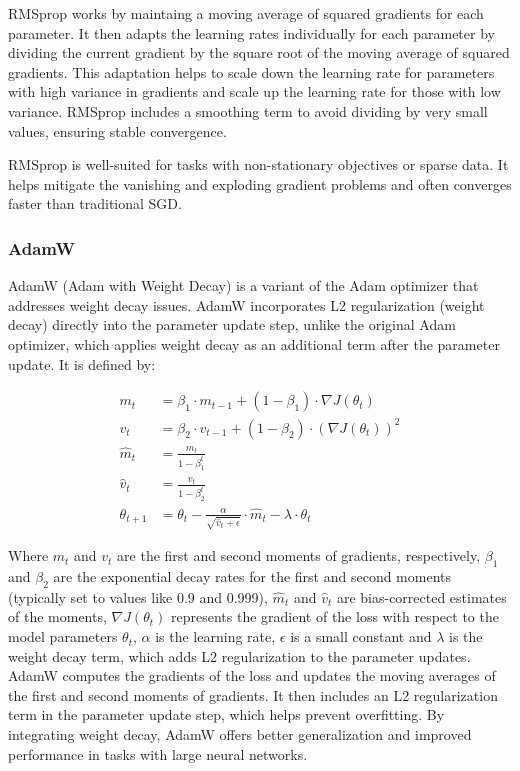 RMSprop works by maintaing a moving average of squared gradients for each parameter. It then adapts the learning rates individually for each parameter by dividing the current gradient by the square root of the moving average of squared gradients.
This adaptation helps to scale down the learning rate for parameters with high variance in gradients and scale up the learning rate for those with low variance.
RMSprop includes a smoothing term to avoid dividing by very small values, ensuring stable convergence.

RMSprop is well-suited for tasks with non-stationary objectives or sparse data. It helps mitigate the vanishing and exploding gradient problems and often converges faster than traditional SGD.

\subsubsection{AdamW}

AdamW (Adam with Weight Decay) is a variant of the Adam optimizer that addresses weight decay issues. AdamW incorporates L2 regularization (weight decay) directly into the parameter update step, unlike the original Adam optimizer, which applies weight decay as an additional term after the parameter update. It is defined by:

\begin{align}
	m_t &= \beta_1 \cdot m_{t-1} + (1 - \beta_1) \cdot \nabla J(\theta_t) \\
	v_t &= \beta_2 \cdot v_{t-1} + (1 - \beta_2) \cdot (\nabla J(\theta_t))^2 \\
	\hat{m}_t &= \frac{m_t}{1 - \beta_1^t} \\
	\hat{v}_t &= \frac{v_t}{1 - \beta_2^t} \\
	\theta_{t+1} &= \theta_t - \frac{\alpha}{\sqrt{\hat{v}_t + \epsilon}} \cdot \hat{m}_t - \lambda \cdot \theta_t
\end{align}

Where \(m_t\) and \(v_t\) are the first and second moments of gradients, respectively, \(\beta_1\) and \(\beta_2\) are the exponential decay rates for the first and second moments (typically set to values like 0.9 and 0.999), \(\hat{m}_t\) and \(\hat{v}_t\) are bias-corrected estimates of the moments, \(\nabla J(\theta_t)\) represents the gradient of the loss with respect to the model parameters \(\theta_t\), \(\alpha\) is the learning rate, \(\epsilon\) is a small constant and \(\lambda\) is the weight decay term, which adds L2 regularization to the parameter updates. \\
AdamW computes the gradients of the loss and updates the moving averages of the first and second moments of gradients.
It then includes an L2 regularization term in the parameter update step, which helps prevent overfitting.
By integrating weight decay, AdamW offers better generalization and improved performance in tasks with large neural networks.\\

